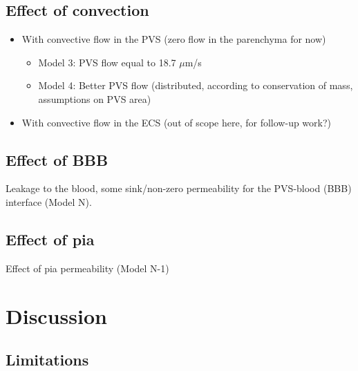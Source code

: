 \documentclass[fleqn,10pt]{wlscirep}
\begin{document}
\subsection*{Effect of convection}
\begin{itemize}
    \item 
    With convective flow in the PVS (zero flow in the parenchyma for now)
    \begin{itemize}
        \item 
        Model 3: PVS flow equal to 18.7 $\mu$m/s
        \item 
        Model 4: Better PVS flow (distributed, according to conservation of mass, assumptions on PVS area)
    \end{itemize}    
    \item 
    With convective flow in the ECS (out of scope here, for follow-up work?)
\end{itemize}

\begin{figure}
    \caption{}
    \label{fig:2}
\end{figure}
\subsection*{Effect of BBB}

Leakage to the blood, some sink/non-zero permeability for the PVS-blood (BBB) interface (Model N).

\begin{figure}
    \caption{}
    \label{fig:3}
\end{figure}

\subsection*{Effect of pia}
  
Effect of pia permeability (Model N-1)    

\begin{figure}
    \caption{}
    \label{fig:4}
\end{figure}


\section*{Discussion}

\subsection*{Limitations}
\end{document}
